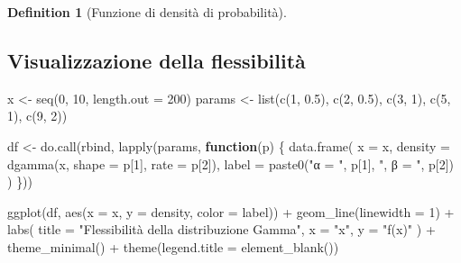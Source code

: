 \documentclass[
  letterpaper,
  DIV=11,
  numbers=noendperiod,
  oneside]{scrreprt}
\newenvironment{Shaded}{\begin{snugshade}}{\end{snugshade}}
\newcommand{\AttributeTok}[1]{\textcolor[rgb]{0.40,0.45,0.13}{#1}}
\newcommand{\ControlFlowTok}[1]{\textcolor[rgb]{0.00,0.23,0.31}{\textbf{#1}}}
\newcommand{\DecValTok}[1]{\textcolor[rgb]{0.68,0.00,0.00}{#1}}
\newcommand{\FloatTok}[1]{\textcolor[rgb]{0.68,0.00,0.00}{#1}}
\newcommand{\FunctionTok}[1]{\textcolor[rgb]{0.28,0.35,0.67}{#1}}
\newcommand{\NormalTok}[1]{\textcolor[rgb]{0.00,0.23,0.31}{#1}}
\newcommand{\OtherTok}[1]{\textcolor[rgb]{0.00,0.23,0.31}{#1}}
\newcommand{\SpecialCharTok}[1]{\textcolor[rgb]{0.37,0.37,0.37}{#1}}
\newcommand{\StringTok}[1]{\textcolor[rgb]{0.13,0.47,0.30}{#1}}
\theoremstyle{definition}
\theoremstyle{plain}
\theoremstyle{definition}
\newtheorem{definition}{Definition}[chapter]
\theoremstyle{remark}
\begin{document}
\begin{definition}[Funzione di densità di
probabilità]
\subsection{Visualizzazione della
flessibilità}\label{visualizzazione-della-flessibilituxe0}

\begin{Shaded}
\begin{Highlighting}[]
\NormalTok{x }\OtherTok{\textless{}{-}} \FunctionTok{seq}\NormalTok{(}\DecValTok{0}\NormalTok{, }\DecValTok{10}\NormalTok{, }\AttributeTok{length.out =} \DecValTok{200}\NormalTok{)}
\NormalTok{params }\OtherTok{\textless{}{-}} \FunctionTok{list}\NormalTok{(}\FunctionTok{c}\NormalTok{(}\DecValTok{1}\NormalTok{, }\FloatTok{0.5}\NormalTok{), }\FunctionTok{c}\NormalTok{(}\DecValTok{2}\NormalTok{, }\FloatTok{0.5}\NormalTok{), }\FunctionTok{c}\NormalTok{(}\DecValTok{3}\NormalTok{, }\DecValTok{1}\NormalTok{), }\FunctionTok{c}\NormalTok{(}\DecValTok{5}\NormalTok{, }\DecValTok{1}\NormalTok{), }\FunctionTok{c}\NormalTok{(}\DecValTok{9}\NormalTok{, }\DecValTok{2}\NormalTok{))}

\NormalTok{df }\OtherTok{\textless{}{-}} \FunctionTok{do.call}\NormalTok{(rbind, }\FunctionTok{lapply}\NormalTok{(params, }\ControlFlowTok{function}\NormalTok{(p) \{}
  \FunctionTok{data.frame}\NormalTok{(}
    \AttributeTok{x =}\NormalTok{ x,}
    \AttributeTok{density =} \FunctionTok{dgamma}\NormalTok{(x, }\AttributeTok{shape =}\NormalTok{ p[}\DecValTok{1}\NormalTok{], }\AttributeTok{rate =}\NormalTok{ p[}\DecValTok{2}\NormalTok{]),}
    \AttributeTok{label =} \FunctionTok{paste0}\NormalTok{(}\StringTok{"α = "}\NormalTok{, p[}\DecValTok{1}\NormalTok{], }\StringTok{", β = "}\NormalTok{, p[}\DecValTok{2}\NormalTok{])}
\NormalTok{  )}
\NormalTok{\}))}

\FunctionTok{ggplot}\NormalTok{(df, }\FunctionTok{aes}\NormalTok{(}\AttributeTok{x =}\NormalTok{ x, }\AttributeTok{y =}\NormalTok{ density, }\AttributeTok{color =}\NormalTok{ label)) }\SpecialCharTok{+}
  \FunctionTok{geom\_line}\NormalTok{(}\AttributeTok{linewidth =} \DecValTok{1}\NormalTok{) }\SpecialCharTok{+}
  \FunctionTok{labs}\NormalTok{(}
    \AttributeTok{title =} \StringTok{"Flessibilità della distribuzione Gamma"}\NormalTok{,}
    \AttributeTok{x =} \StringTok{"x"}\NormalTok{, }\AttributeTok{y =} \StringTok{"f(x)"}
\NormalTok{  ) }\SpecialCharTok{+}
  \FunctionTok{theme\_minimal}\NormalTok{() }\SpecialCharTok{+}
  \FunctionTok{theme}\NormalTok{(}\AttributeTok{legend.title =} \FunctionTok{element\_blank}\NormalTok{())}
\end{Highlighting}
\end{Shaded}


\end{definition}
\end{document}
